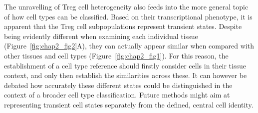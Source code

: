 The unravelling of Treg cell heterogeneity also feeds into the more general topic of how cell types can be classified. Based on their transcriptional phenotype, it is apparent that the Treg cell subpopulations represent transient states. Despite being evidently different when examining each individual tissue (Figure~\ref{fig:chap2_fig2}A), they can actually appear similar when compared with other tissues and cell types (Figure~\ref{fig:chap2_fig1}). For this reason, the establishment of a cell type reference should firstly consider cells in their tissue context, and only then establish the similarities across these. It can however be debated how accurately these different states could be distinguished in the context of a broader cell type classification. Future methods might aim at representing transient cell states separately from the defined, central cell identity.

